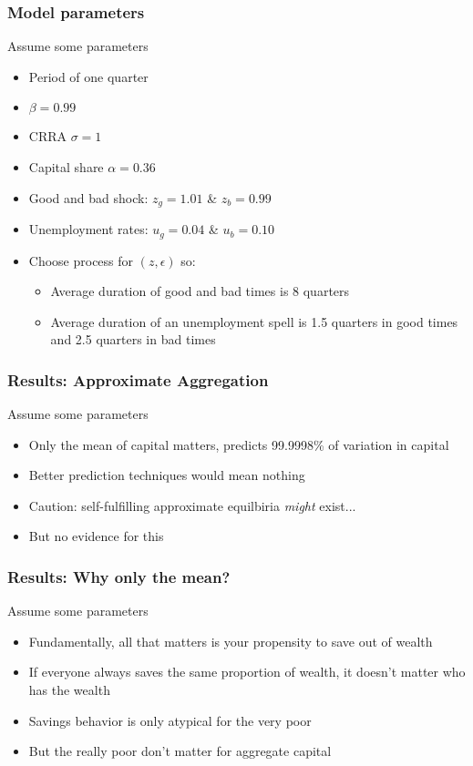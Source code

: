 \documentclass{beamer}
\begin{document}
\begin{frame}
\frametitle[alignment=center]{Model parameters}
Assume some parameters
\begin{itemize}
\item Period of one quarter
\item $\beta=0.99$
\item CRRA $\sigma=1$
\item Capital share $\alpha=0.36$
\item Good and bad shock: $z_g=1.01$ \& $z_b=0.99$
\item Unemployment rates: $u_g=0.04$ \& $u_b=0.10$
\item Choose process for $(z,\epsilon)$ so:
\begin{itemize}
\item Average duration of good and bad times is 8 quarters
\item Average duration of an unemployment spell is 1.5 quarters in good times and 2.5 quarters in bad times
\end{itemize}
\end{itemize}
\end{frame}


\begin{frame}
\frametitle[alignment=center]{Results: Approximate Aggregation}
Assume some parameters
\begin{itemize}
\item Only the mean of capital matters, predicts 99.9998\% of variation in capital 
\bigskip
\item Better prediction techniques would mean nothing
\bigskip
\item Caution: self-fulfilling approximate equilbiria \emph{might} exist...
\bigskip
\item But no evidence for this
\end{itemize}
\end{frame}

\begin{frame}
\frametitle[alignment=center]{Results: Why only the mean?}
Assume some parameters
\begin{itemize}
\item Fundamentally, all that matters is your propensity to save out of wealth 
\bigskip
\item If everyone always saves the same proportion of wealth, it doesn't matter who has the wealth
\bigskip
\item Savings behavior is only atypical for the very poor
\bigskip
\item But the really poor don't matter for aggregate capital
\end{itemize}
\end{frame}
\end{document}
